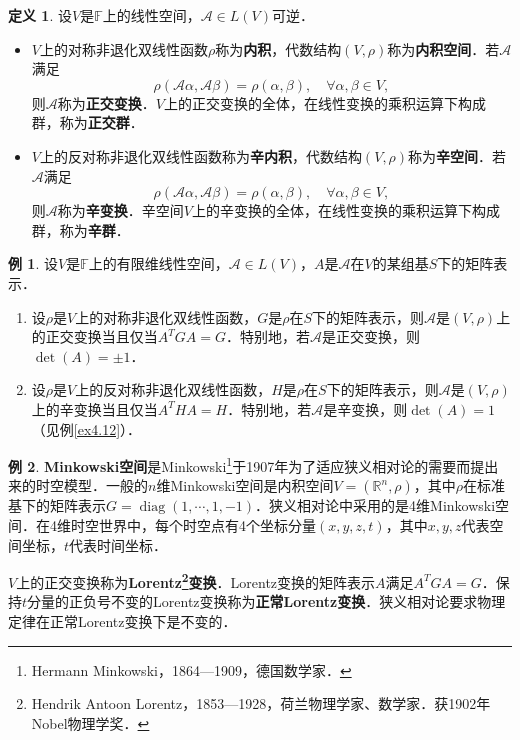 \documentclass[a4paper,fontset=windows]{ctexbook}
\theoremstyle{definition}
\newtheorem{definition}{定义}[chapter]
\newtheorem{example}{例}[chapter]
\DeclareMathOperator{\diag}{diag}
\begin{document}
\begin{definition}
设$V$是$\mathbb{F}$上的线性空间，$\mathcal{A}\in L(V)$可逆．
\begin{itemize}
\item $V$上的对称非退化双线性函数$\rho$称为{\bf 内积}，代数结构$(V,\rho)$称为{\bf 内积空间}．若$\mathcal{A}$满足
$$\rho(\mathcal{A}\alpha,\mathcal{A}\beta)=\rho(\alpha,\beta),\quad\forall\alpha,\beta\in V,$$
则$\mathcal{A}$称为{\bf 正交变换}．$V$上的正交变换的全体，在线性变换的乘积运算下构成群，称为{\bf 正交群}．

\item $V$上的反对称非退化双线性函数称为{\bf 辛内积}，代数结构$(V,\rho)$称为{\bf 辛空间}．若$\mathcal{A}$满足
$$\rho(\mathcal{A}\alpha,\mathcal{A}\beta)=\rho(\alpha,\beta),\quad\forall\alpha,\beta\in V,$$
则$\mathcal{A}$称为{\bf 辛变换}．辛空间$V$上的辛变换的全体，在线性变换的乘积运算下构成群，称为{\bf 辛群}．
\end{itemize}
\end{definition}

\begin{example}
设$V$是$\mathbb{F}$上的有限维线性空间，$\mathcal{A}\in L(V)$，$A$是$\mathcal{A}$在$V$的某组基$S$下的矩阵表示．
\begin{enumerate}
\item 设$\rho$是$V$上的对称非退化双线性函数，$G$是$\rho$在$S$下的矩阵表示，则$\mathcal{A}$是$(V,\rho)$上的正交变换当且仅当$A^TGA=G$．特别地，若$\mathcal{A}$是正交变换，则$\det(A)=\pm 1$．

\item 设$\rho$是$V$上的反对称非退化双线性函数，$H$是$\rho$在$S$下的矩阵表示，则$\mathcal{A}$是$(V,\rho)$上的辛变换当且仅当$A^THA=H$．特别地，若$\mathcal{A}$是辛变换，则$\det(A)=1$（见例\ref{ex4.12}）．
\end{enumerate}
\end{example}

\begin{example}
{\bf Minkowski空间}是Minkowski\footnote{Hermann Minkowski，1864—1909，德国数学家．}于1907年为了适应狭义相对论的需要而提出来的时空模型．一般的$n$维Minkowski空间是内积空间$V=(\mathbb{R}^n,\rho)$，其中$\rho$在标准基下的矩阵表示$G=\diag(1,\cdots,1,-1)$．狭义相对论中采用的是4维Minkowski空间．在4维时空世界中，每个时空点有4个坐标分量$(x,y,z,t)$，其中$x,y,z$代表空间坐标，$t$代表时间坐标．

$V$上的正交变换称为{\bf Lorentz\footnote{Hendrik Antoon Lorentz，1853—1928，荷兰物理学家、数学家．获1902年Nobel物理学奖．}变换}．Lorentz变换的矩阵表示$A$满足$A^TGA=G$．保持$t$分量的正负号不变的Lorentz变换称为{\bf 正常Lorentz变换}．狭义相对论要求物理定律在正常Lorentz变换下是不变的．
\end{example}
\end{document}
